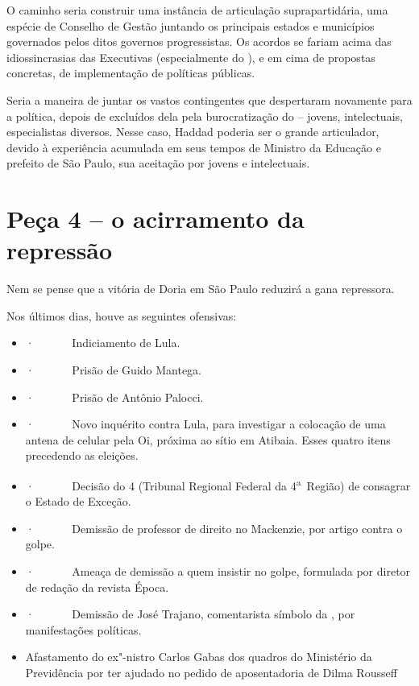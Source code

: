 O caminho seria construir uma instância de articulação suprapartidária,
uma espécie de Conselho de Gestão juntando os principais estados e
municípios governados pelos ditos governos progressistas. Os acordos se
fariam acima das idiossincrasias das Executivas (especialmente do ), e
em cima de propostas concretas, de implementação de políticas públicas.

Seria a maneira de juntar os vastos contingentes que despertaram
novamente para a política, depois de excluídos dela pela burocratização
do  -- jovens, intelectuais, especialistas diversos. Nesse caso,
Haddad poderia ser o grande articulador, devido à experiência acumulada
em seus tempos de Ministro da Educação e prefeito de São Paulo, sua
aceitação por jovens e intelectuais.

\section{Peça 4 -- o acirramento da repressão}

Nem se pense que a vitória de Doria em São Paulo reduzirá a gana
repressora.

Nos últimos dias, houve as seguintes ofensivas:

\begin{itemize}
\itemsep1pt\parskip0pt
\item
  ·~~~~~~ Indiciamento de Lula.
\item
  ·~~~~~~ Prisão de Guido Mantega.
\item
  ·~~~~~~ Prisão de Antônio Palocci.
\item
  ·~~~~~~ Novo inquérito contra Lula, para investigar a colocação de uma
  antena de celular pela Oi, próxima ao sítio em Atibaia. Esses quatro
  itens precedendo as eleições.
\item
  ·~~~~~~ Decisão do 4 (Tribunal Regional Federal da
  4\textsuperscript{a}~Região) de consagrar o Estado de Exceção.
\item
  ·~~~~~~ Demissão de professor de direito no Mackenzie, por artigo
  contra o golpe.
\item
  ·~~~~~~ Ameaça de demissão a quem insistir no golpe, formulada por
  diretor de redação da revista Época.
\item
  ·~~~~~~ Demissão de José Trajano, comentarista símbolo da , por
  manifestações políticas.
\item
  Afastamento do ex"-nistro Carlos Gabas dos quadros do Ministério da
  Previdência por ter ajudado no pedido de aposentadoria de Dilma
  Rousseff
\end{itemize}

